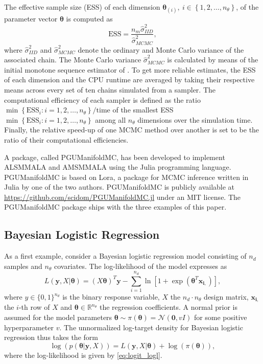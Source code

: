 \documentclass[twoside,11pt]{article}
\begin{document}
{The effective sample size (ESS) of each dimension $\boldsymbol{\theta}_{(i)},~i\in\left\{1,2,\dots,n_{\theta}\right\}$,
of the parameter vector $\boldsymbol{\theta}$ is computed as
\begin{equation}
\mbox{ESS} =
\dfrac{n_m\hat{\sigma}^2_{IID}}{\hat{\sigma}^2_{MCMC}},
\end{equation}
where $\hat{\sigma}^2_{IID}$ and $\hat{\sigma}^2_{MCMC}$ denote the ordinary and Monte Carlo variance of the associated 
chain. The Monte Carlo variance $\hat{\sigma}^2_{MCMC}$ is calculated by means of the initial monotone sequence estimator of
\cite{gey__pra}. To get more reliable estimates, the ESS of each dimension and the CPU runtime are averaged by taking their
respective means across every set of ten chains simulated from a sampler. The computational efficiency of each sampler is
defined as the ratio $\min\left\{\mbox{ESS}_i:i=1,2,\dots,n_{\theta}\right\}/\mbox{time}$ of the smallest ESS
$\min\left\{\mbox{ESS}_i:i=1,2,\dots,n_{\theta}\right\}$ among all $n_{\theta}$ dimensions over the simulation time. Finally,
the relative speed-up of one MCMC method over another is set to be the ratio of their computational efficiencies.

A package, called PGUManifoldMC, has been developed to implement ALSMMALA and AMSMMALA using the Julia programming language.
PGUManifoldMC is based on Lora, a package for MCMC inference written in Julia by one of the two authors. PGUManifoldMC is
publicly available at \url{https://github.com/scidom/PGUManifoldMC.jl} under an MIT license. The PGUManifoldMC package ships
with the three examples of this paper.

\subsection{Bayesian Logistic Regression}

As a first example, consider a Bayesian logistic regression model consisting of $n_d$ samples and $n_{\theta}$ covariates. 
The log-likelihood of the model expresses as
\begin{equation}
\label{eq:logit_logl}
L(\mathbf{y}, X | \boldsymbol{\theta})=
(X\boldsymbol{\theta})^T\mathbf{y}-
\sum_{i=1}^{n_d}\ln\left[1+\exp(\boldsymbol{\theta}^T
\mathbf{x_{i,}})\right],
\end{equation}
where $y\in\{0,1\}^{n_d}$ is the binary response variable, $X$ the $n_d\cdot n_{\theta}$ design matrix, $\mathbf{x_{i,}}$ 
the $i$-th row of $X$ and $\boldsymbol{\theta}\in\mathbb{R}^{n_{\theta}}$ the regression coefficients. A normal prior is 
assumed for the model parameters $\boldsymbol{\theta}\sim\pi({\boldsymbol{\theta}})=\mathcal{N}(\boldsymbol{0},vI)$ for some
positive hyperparameter $v$. The unnormalized log-target density for Bayesian logistic regression thus takes the form
\begin{equation}
\log{(p(\boldsymbol{\theta}|\mathbf{y}, X))}=L(\mathbf{y}, X | \boldsymbol{\theta})+\log{(\pi(\boldsymbol{\theta}))},
\end{equation}
where the log-likelihood is given by \eqref{eq:logit_logl}.

}
\end{document}
